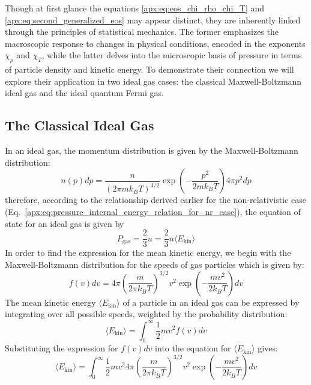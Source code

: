 \documentclass[main.tex]{subfiles}
\begin{document}
Though at first glance the equations \eqref{apx:eq:eos_chi_rho_chi_T} and \eqref{apx:eq:second_generalized_eos} may appear distinct, they are inherently linked through the principles of statistical mechanics. The former emphasizes the macroscopic response to changes in physical conditions, encoded in the exponents $\chi_\rho$ and $\chi_T$, while the latter delves into the microscopic basis of pressure in terms of particle density and kinetic energy. To demonstrate their connection we will explore their application in two ideal gas cases: the classical Maxwell-Boltzmann ideal gas and the ideal quantum Fermi gas.

\subsection{The Classical Ideal Gas}
In an ideal gas, the momentum distribution is given by the Maxwell-Boltzmann distribution:
\begin{equation}
    n(p) dp = \frac{n}{(2\pi m k_BT)^{3/2}} \exp\left(- \frac{p^2}{2mk_BT}\right) 4\pi p^2 dp
\end{equation}
therefore, according to the relationship derived earlier for the non-relativistic case (Eq.~\ref{apx:eq:pressure_internal_energy_relation_for_nr_case}), the equation of state for an ideal gas is given by
\begin{equation}\label{apx:eq:pgas}
    P_{\text{gas}} = \frac{2}{3}u = \frac{2}{3} n \langle E_{\text{kin}} \rangle
\end{equation}
In order to find the expression for the mean kinetic energy, we begin with the Maxwell-Boltzmann distribution for the speeds of gas particles which is given by:
\begin{equation*}
    f(v)dv = 4\pi \left( \frac{m}{2\pi k_BT} \right)^{3/2} v^2 \exp\left(-\frac{mv^2}{2k_BT}\right)dv
\end{equation*}
The mean kinetic energy $\langle E_{\text{kin}} \rangle$ of a particle in an ideal gas can be expressed by integrating over all possible speeds, weighted by the probability distribution:
\begin{equation*}
    \langle E_{\text{kin}} \rangle = \int_{0}^{\infty} \frac{1}{2} m v^2 f(v) dv
\end{equation*}
Substituting the expression for $f(v)dv$ into the equation for $\langle E_{\text{kin}} \rangle$ gives:
\begin{equation*}
    \langle E_{\text{kin}} \rangle = \int_{0}^{\infty} \frac{1}{2} m v^2 4\pi \left( \frac{m}{2\pi k_BT} \right)^{3/2} v^2 \exp\left(-\frac{mv^2}{2k_BT}\right) dv
\end{equation*}
\end{document}
